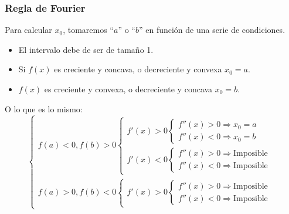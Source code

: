 \subsubsection{Regla de Fourier}
 Para calcular \(x_0\), tomaremos ``\(a\)'' o ``\(b\)'' en función de una serie de condiciones.
\begin{itemize}
        \item El intervalo debe de ser de tamaño 1.
        \item Si \(f(x)\) es creciente y concava, o decreciente y convexa \(x_0 = a\).
        \item \(f(x)\) es creciente y convexa, o decreciente y concava \(x_0 = b\).
\end{itemize}
 O lo que es lo mismo:
\[
        \boxed{
                \begin{cases}
                        f(a) < 0, f(b) > 0 \begin{cases}
                                                   f'(x) > 0
                                                   \begin{cases}
                                        f''(x) > 0 \Rightarrow x_0 = a
                                        \\
                                        f''(x) < 0 \Rightarrow x_0 = b
                                \end{cases}
                                                   \\
                                                   f'(x) < 0
                                                   \begin{cases}
                                        f''(x) > 0 \Rightarrow \text{Imposible}
                                        \\
                                        f''(x) < 0 \Rightarrow \text{Imposible}
                                \end{cases}
                                           \end{cases}
                        \\
                        f(a) > 0, f(b) < 0
                        \begin{cases}
                                f'(x) > 0
                                \begin{cases}
                                        f''(x) > 0 \Rightarrow \text{Imposible}
                                        \\
                                        f''(x) < 0 \Rightarrow \text{Imposible}

\end{cases}
\end{cases}
\end{cases}}\]
